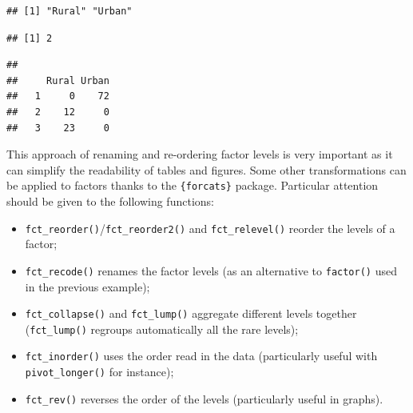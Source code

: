 \documentclass[
]{krantz}
\makeatletter
\newenvironment{Shaded}{\begin{snugshade}}{\end{snugshade}}
\newcommand{\AttributeTok}[1]{\textcolor[rgb]{0.61,0.61,0.61}{#1}}
\newcommand{\FunctionTok}[1]{\textcolor[rgb]{0,0,0}{#1}}
\newcommand{\NormalTok}[1]{#1}
\newcommand{\SpecialCharTok}[1]{\textcolor[rgb]{0,0,0}{#1}}
\newcommand{\StringTok}[1]{\textcolor[rgb]{0.5,0.5,0.5}{#1}}
\providecommand{\tightlist}{%
  \setlength{\itemsep}{0pt}\setlength{\parskip}{0pt}}
\newenvironment{kframe}{%
\medskip{}
\setlength{\fboxsep}{.8em}
 \def\at@end@of@kframe{}%
 \ifinner\ifhmode%
  \def\at@end@of@kframe{\end{minipage}}%
  \begin{minipage}{\columnwidth}%
 \fi\fi%
 \def\FrameCommand##1{\hskip\@totalleftmargin \hskip-\fboxsep
 \colorbox{shadecolor}{##1}\hskip-\fboxsep
     \hskip-\linewidth \hskip-\@totalleftmargin \hskip\columnwidth}%
 \MakeFramed {\advance\hsize-\width
   \@totalleftmargin\z@ \linewidth\hsize
   \@setminipage}}%
 {\par\unskip\endMakeFramed%
 \at@end@of@kframe}
\renewenvironment{Shaded}{\begin{kframe}}{\end{kframe}}
\makeatother
\begin{document}
\begin{verbatim}
## [1] "Rural" "Urban"
\end{verbatim}

\begin{Shaded}
\end{Shaded}

\begin{verbatim}
## [1] 2
\end{verbatim}

\begin{Shaded}
\end{Shaded}

\begin{verbatim}
##    
##     Rural Urban
##   1     0    72
##   2    12     0
##   3    23     0
\end{verbatim}

This approach of renaming and re-ordering factor levels is very important as it can simplify the readability of tables and figures.
Some other transformations can be applied to factors thanks to the \texttt{\{forcats\}} package. Particular attention should be given to the following functions:

\begin{itemize}
\tightlist
\item
  \texttt{fct\_reorder()}/\texttt{fct\_reorder2()} and \texttt{fct\_relevel()} reorder the levels of a factor;
\item
  \texttt{fct\_recode()} renames the factor levels (as an alternative to \texttt{factor()} used in the previous example);
\item
  \texttt{fct\_collapse()} and \texttt{fct\_lump()} aggregate different levels together (\texttt{fct\_lump()} regroups automatically all the rare levels);
\item
  \texttt{fct\_inorder()} uses the order read in the data (particularly useful with \texttt{pivot\_longer()} for instance);
\item
  \texttt{fct\_rev()} reverses the order of the levels (particularly useful in graphs).
\end{itemize}
\end{document}
